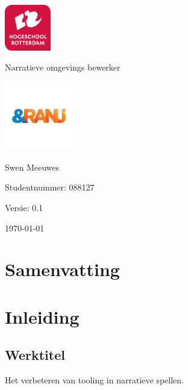 \documentclass{report}
\newcommand{\versionnumber}{0.1}
\newcommand{\name}{Swen Meeuwes}
\newcommand{\studentnumber}{088127}
\renewcommand{\title}{Narratieve omgevings bewerker}
\newcommand{\subtitle}{Sub title}
\begin{document}
\begin{titlepage}
        \centering
        \includegraphics[width=2cm]{Images/University}\par
        \vspace{4\baselineskip}
        {\Huge\title\par}
        \par
        \includegraphics[width=3cm]{Images/Organisation}
        \vspace{4\baselineskip}
        \par
        {\Large\name\par}
        {Studentnummer: \studentnumber\par}
        \vfill
        {\hfill Versie: \versionnumber\par}
        {\hfill \today}
\end{titlepage}

\chapter*{Samenvatting}

\newpage

\tableofcontents

\newpage

\chapter{Inleiding}
\section{Werktitel}
Het verbeteren van tooling in narratieve spellen.
\end{document}

